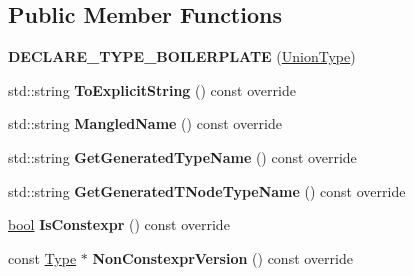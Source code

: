 \subsection*{Public Member Functions}
\begin{DoxyCompactItemize}
\item 
\mbox{\label{classv8_1_1internal_1_1torque_1_1UnionType_af64bea29207f10971acd311c9a0a2416}} 
{\bfseries D\+E\+C\+L\+A\+R\+E\+\_\+\+T\+Y\+P\+E\+\_\+\+B\+O\+I\+L\+E\+R\+P\+L\+A\+TE} (\mbox{\hyperlink{classv8_1_1internal_1_1torque_1_1UnionType}{Union\+Type}})
\item 
\mbox{\label{classv8_1_1internal_1_1torque_1_1UnionType_a2b08b0b90c1b59f599199856a0889934}} 
std\+::string {\bfseries To\+Explicit\+String} () const override
\item 
\mbox{\label{classv8_1_1internal_1_1torque_1_1UnionType_afd55037e8815f0aac25168b7efbff802}} 
std\+::string {\bfseries Mangled\+Name} () const override
\item 
\mbox{\label{classv8_1_1internal_1_1torque_1_1UnionType_ac395334eeb91aa454d989e6c949f8fd5}} 
std\+::string {\bfseries Get\+Generated\+Type\+Name} () const override
\item 
\mbox{\label{classv8_1_1internal_1_1torque_1_1UnionType_aefdf0bb28238a8485d7ea4a7e19a764e}} 
std\+::string {\bfseries Get\+Generated\+T\+Node\+Type\+Name} () const override
\item 
\mbox{\label{classv8_1_1internal_1_1torque_1_1UnionType_ac909d430394d58ba3a6f16b179ecccd9}} 
\mbox{\hyperlink{classbool}{bool}} {\bfseries Is\+Constexpr} () const override
\item 
\mbox{\label{classv8_1_1internal_1_1torque_1_1UnionType_abc84a6de87fa532aa334352e75affa5d}} 
const \mbox{\hyperlink{classv8_1_1internal_1_1torque_1_1Type}{Type}} $\ast$ {\bfseries Non\+Constexpr\+Version} () const override
\item 
\mbox{\label{classv8_1_1internal_1_1torque_1_1UnionType_ae9f57d35824ff489af4652aa63acfaef}} 

\end{DoxyCompactItemize}
